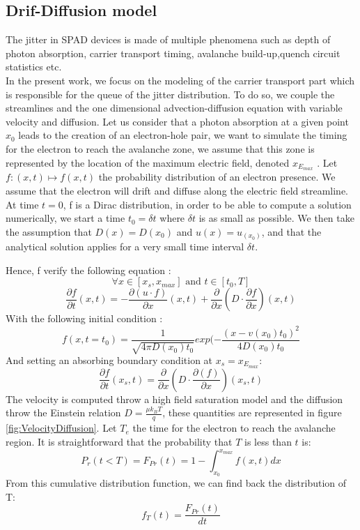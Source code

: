 \documentclass[10pt,a4paper,twocolumn]{article}
\begin{document}
\subsection{Drif-Diffusion model}
The jitter in SPAD devices is made of multiple phenomena such as depth of photon absorption, carrier transport timing, avalanche build-up,quench circuit statistics etc. \\In the present work, we focus on the modeling of the carrier transport part which is responsible for the queue of the jitter  distribution. To do so, we couple the streamlines and the one dimensional advection-diffusion equation with variable velocity and diffusion.
Let us consider that a photon absorption at a given point $x_0$ leads to the creation of an electron-hole pair, we want to simulate the timing for the electron to reach the avalanche zone, we assume that this zone is represented by the location of the maximum electric field, denoted $x_{E_{max}}$ . Let $f : (x,t) \mapsto f(x,t)$ the probability distribution of an electron presence. We assume that the electron will drift and diffuse along the electric field streamline. At time $t=0$, f is a Dirac distribution, in order to be able to compute a solution numerically, we start a time $t_0 = \delta t$ where $\delta t$ is as small as possible. We then take the assumption that $D(x) = D(x_0)$ and $u(x) = u_(x_0)$, and that the analytical solution applies for a very small time interval $\delta t$.

 Hence, f verify the following equation : 
 \[ \forall x \in \left[ x_s, x_{max} \right]  \text{ and } t \in \left[ t_0, T \right] \]
\begin{equation}\label{eq:GeneralAD}
\frac{\partial f}{\partial t}(x,t) = 
	- \frac{\partial( u \cdot f )}{\partial x}(x,t)
	+ \frac{\partial}{\partial x}\left(D \cdot \frac{\partial f }{\partial x}\right)(x,t)
\end{equation}
With the following initial condition : 
\begin{equation}
f(x, t=t_0) = \frac{1}{\sqrt{4 \pi D(x_0) t_0}} exp(-\frac{(x-v(x_0)t_0)^2}{4D(x_0)t_0}
\end{equation}
And setting an absorbing boundary condition at $x_s=x_{E_{max}}$:
\begin{equation}
\frac{\partial f}{\partial t}(x_s,t) = 
	\frac{\partial}{\partial x}\left(D \cdot \frac{\partial( f )}{\partial x}\right)(x_s,t)
\end{equation}
The velocity is computed throw a high field saturation model and the diffusion throw the Einstein relation $D = \frac{\mu k_B T}{q}$, these quantities are represented in figure \ref{fig:VelocityDiffusion}. 
Let $T_e$ the time for the electron to reach the avalanche region. It is straightforward that the probability that $T$ is less than $t$ is:
 \[P_r(t<T) =  F_{Pr}(t) = 1 - \int_{x_0}^{x_{max}} f(x, t) dx \]
From this cumulative distribution function, we can find back the distribution of T:
\begin{equation}
f_T (t) = \frac{F_{Pr}(t)}{dt}
\end{equation}
\end{document}
